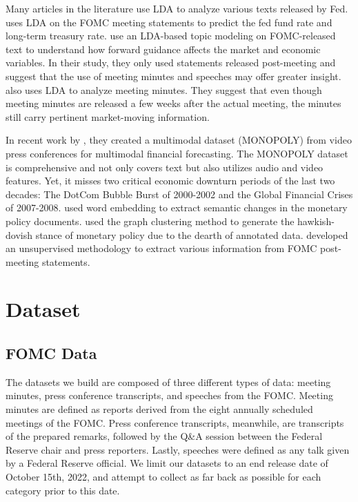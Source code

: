 \documentclass[11pt]{article}
\begin{document}
Many articles in the literature use LDA to analyze various texts released by Fed. \citet{rohlfs-etal-2016-effects} uses LDA on the FOMC meeting statements to predict the fed fund rate and long-term treasury rate. \citet{hansen2016shocking} use an LDA-based topic modeling on FOMC-released text to understand how forward guidance affects the market and economic variables. In their study, they only used statements released post-meeting and suggest that the use of meeting minutes and speeches may offer greater insight. \citet{jegadeesh2017deciphering} also uses LDA to analyze meeting minutes. They suggest that even though meeting minutes are released a few weeks after the actual meeting, the minutes still carry pertinent market-moving information. 

In recent work by \citet{10.1145/3503161.3548380}, they created a multimodal dataset (MONOPOLY) from video press conferences for multimodal financial forecasting. The MONOPOLY dataset is comprehensive and not only covers text but also utilizes audio and video features. Yet, it misses two critical economic downturn periods of the last two decades: The DotCom Bubble Burst of 2000-2002 and the Global Financial Crises of 2007-2008.  \citet{matsui-etal-2021-using} used word embedding to extract semantic changes in the monetary policy documents. \citet{zirn-etal-2015-lost} used the graph clustering method to generate the hawkish-dovish stance of monetary policy due to the dearth of annotated data. \citet{frunza-2020-information} developed an unsupervised methodology to extract various information from FOMC post-meeting statements. 


\section{Dataset}
\subsection{FOMC Data}

The datasets we build are composed of three different types of data: meeting minutes, press conference transcripts, and speeches from the FOMC.
Meeting minutes are defined as reports derived from the eight annually scheduled meetings of the FOMC. Press conference transcripts, meanwhile, are transcripts of the prepared remarks, followed by the Q\&A session between the Federal Reserve chair and press reporters. Lastly, speeches were defined as any talk given by a Federal Reserve official. We limit our datasets to an end release date of October 15th, 2022, and attempt to collect as far back as possible for each category prior to this date.
\end{document}
